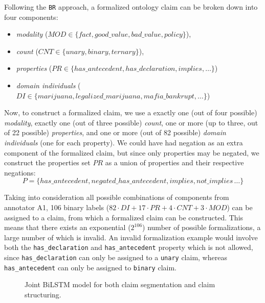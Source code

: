 Following the \texttt{BR} approach, a formalized ontology claim can be broken
down into four components:
\begin{itemize}
	\item \emph{modality} ($\mathit{MOD} \in \{\mathit{fact},
		\mathit{good\_value}, \mathit{bad\_value}, \mathit{policy}\}$), 
	\item \emph{count} ($\mathit{CNT} \in \{\mathit{unary},
		\mathit{binary},  \mathit{ternary}\}$),
	\item \emph{properties} ($\mathit{PR} \in \{\mathit{has\_antecedent},
		\mathit{has\_declaration}, \mathit{implies}, \dots\}$)
	\item \emph{domain individuals} ($\mathit{DI} \in \{\mathit{marijuana},
		\mathit{legalized\_marijuana}, \mathit{mafia\_bankrupt},
		\dots\}$)
\end{itemize}
Now, to construct a formalized claim, we use a exactly one (out of four
possible) \emph{modality}, exactly one (out of three possible) \emph{count},
one or more (up to three, out of 22 possible) \emph{properties}, and one
or more (out of 82 possible) \emph{domain individuals} (one for each property). 
We could have had negation as an extra component of the formalized claim, but
since only properties may be negated, we construct the properties set $PR$ as a
union of properties and their respective negations: 
$$
P = \{\mathit{has\_antecedent}, 
\mathit{negated\_has\_antecedent}, \mathit{implies}, \mathit{not\_implies}\, \dots\}
$$

Taking into consideration all possible combinations of components from
annotator A1, 106 binary labels ($82 \cdot \mathit{DI} + 17 \cdot \mathit{PR} + 4\cdot
\mathit{CNT} + 3 \cdot \mathit{MOD}$) can be assigned to a claim, from which a
formalized claim can be constructed.  This means that there  exists an
exponential ($2^{106}$) number of possible formalizations, a large number of
which is invalid.  An invalid formalization example would involve both the
\texttt{has\_declaration} and \texttt{has\_antecedent} property which is not allowed,
since \texttt{has\_declaration} can only be assigned to a \texttt{unary} claim,
whereas \texttt{has\_antecedent} can only be assigned to \texttt{binary} claim. 

\begin{figure}
	
	\caption{Joint BiLSTM model for both claim segmentation and claim 
	structuring. }
	\label{fig:joint_model}
\end{figure}


